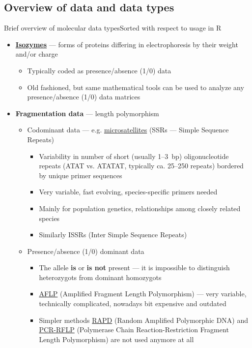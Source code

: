 \documentclass[compress, ucs, xelatex, 11pt, xcolor=svgnames, aspectratio=169,
	hyperref={
		bookmarks=true,
		unicode=true,
		colorlinks=true,
		pdftitle={Molecular data in R},
		plainpages=false,
		pdfauthor={Vojtech Zeisek},
		pdfsubject={Course about phylogeny and evolution in R},
		pdfcreator={XeLaTeX},
		pdfkeywords={R, evolution, phylogeny, molecular data},
		linkcolor=Crimson, %
		anchorcolor=Magenta, %
		citecolor=Magenta, %
		filecolor=Magenta, %
		menucolor=Magenta, %
		urlcolor=DodgerBlue, %
		pdftex},
	url={hyphens, lowtilde} %
	]{beamer}
\begin{document}
\subsection[Overview]{Overview of data and data types}

\begin{frame}[allowframebreaks]{Brief overview of molecular data types}{Sorted with respect to usage in R}
	\begin{itemize}
		\item \textbf{\href{https://en.wikipedia.org/wiki/Isozyme}{Isozymes}} --- forms of proteins differing in electrophoresis by their weight and/or charge
		\begin{itemize}
			\item Typically coded as presence/absence (1/0) data
			\item Old fashioned, but same mathematical tools can be used to analyze any presence/absence (1/0) data matrices
		\end{itemize}
		\item \textbf{Fragmentation data} --- length polymorphism
		\begin{itemize}
			\item Codominant data --- e.g. \href{https://en.wikipedia.org/wiki/Microsatellite}{microsatellites} (SSRs --- Simple Sequence Repeats)
			\begin{itemize}
				\item Variability in number of short (usually 1--3~bp) oligonucleotide repeats (ATAT vs. ATATAT, typically ca. 25--250 repeats) bordered by unique primer sequences
				\item Very variable, fast evolving, species-specific primers needed
				\item Mainly for population genetics, relationships among closely related species
				\item Similarly ISSRs (Inter Simple Sequence Repeats)
			\end{itemize}
			\item Presence/absence (1/0) dominant data
			\begin{itemize}
				\item The allele \textbf{is} or \textbf{is not} present  --- it is impossible to distinguish heterozygots from dominant homozygots
				\item \href{https://en.wikipedia.org/wiki/Amplified_fragment_length_polymorphism}{AFLP} (Amplified Fragment Length Polymorphism) --- very variable, technically complicated, nowadays bit expensive and outdated
				\item Simpler methods \href{https://en.wikipedia.org/wiki/Random_amplification_of_polymorphic_DNA}{RAPD} (Random Amplified Polymorphic DNA) and \href{https://en.wikipedia.org/wiki/Restriction_fragment_length_polymorphism}{PCR-RFLP} (Polymerase Chain Reaction-Restriction Fragment Length Polymorphism) are not used anymore at all

\end{itemize}
\end{itemize}
\end{itemize}
\end{frame}
\end{document}

